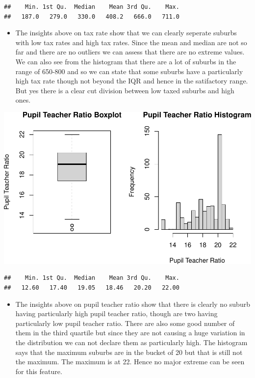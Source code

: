 \documentclass[
]{article}
\providecommand{\tightlist}{%
  \setlength{\itemsep}{0pt}\setlength{\parskip}{0pt}}
\begin{document}
\begin{verbatim}
##    Min. 1st Qu.  Median    Mean 3rd Qu.    Max. 
##   187.0   279.0   330.0   408.2   666.0   711.0
\end{verbatim}

\begin{itemize}
\tightlist
\item
  The insights above on tax rate show that we can clearly seperate
  suburbs with low tax rates and high tax rates. Since the mean and
  median are not so far and there are no outliers we can assess that
  there are no extreme values. We can also see from the histogram that
  there are a lot of suburbs in the range of 650-800 and so we can state
  that some suburbs have a particularly high tax rate though not beyond
  the IQR and hence in the satifactory range. But yes there is a clear
  cut division between low taxed suburbs and high ones.
\end{itemize}

\begin{center}\includegraphics{Disha_Gandhi_Take_Home_Exam_PDF_files/figure-latex/unnamed-chunk-11-1} \end{center}

\begin{verbatim}
##    Min. 1st Qu.  Median    Mean 3rd Qu.    Max. 
##   12.60   17.40   19.05   18.46   20.20   22.00
\end{verbatim}

\begin{itemize}
\tightlist
\item
  The insights above on pupil teacher ratio show that there is clearly
  no suburb having particularly high pupil teacher ratio, though are two
  having particularly low pupil teacher ratio. There are also some good
  number of them in the third quartile but since they are not causing a
  huge variation in the distribution we can not declare them as
  particularly high. The histogram says that the maximum suburbs are in
  the bucket of 20 but that is still not the maximum. The maximum is at
  22. Hence no major extreme can be seen for this feature.
\end{itemize}
\end{document}
